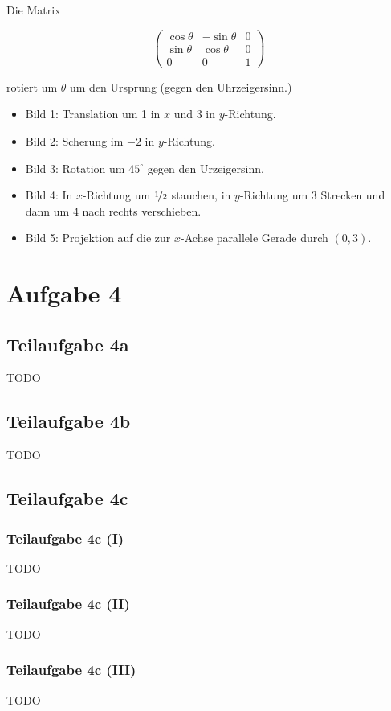 \documentclass[a4paper]{scrartcl}
\begin{document}
Die Matrix

\[\begin{pmatrix}\cos \theta & -\sin \theta & 0\\\sin \theta & \cos \theta & 0\\0 & 0 & 1\end{pmatrix}\]

rotiert um $\theta$ um den Ursprung (gegen den Uhrzeigersinn.)

\begin{itemize}
    \item Bild 1: Translation um 1 in $x$ und 3 in $y$-Richtung.
    \item Bild 2: Scherung im $-2$ in $y$-Richtung.
    \item Bild 3: Rotation um $45^\circ$ gegen den Urzeigersinn.
    \item Bild 4: In $x$-Richtung um $\nicefrac{1}{2}$ stauchen, in $y$-Richtung
                  um 3 Strecken und dann um 4 nach rechts verschieben.
    \item Bild 5: Projektion auf die zur $x$-Achse parallele Gerade durch $(0, 3)$.
\end{itemize}


\section*{Aufgabe 4}
\subsection*{Teilaufgabe 4a}
TODO
\subsection*{Teilaufgabe 4b}
TODO
\subsection*{Teilaufgabe 4c}
\subsubsection*{Teilaufgabe 4c (I)}
TODO
\subsubsection*{Teilaufgabe 4c (II)}
TODO
\subsubsection*{Teilaufgabe 4c (III)}
TODO
\end{document}
